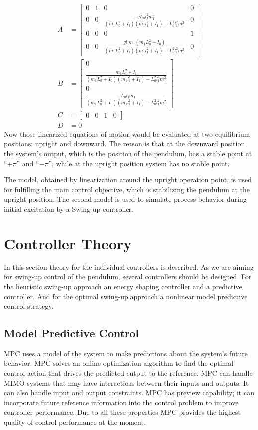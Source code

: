 \begin{subequations}\label{linmatrices}
	\begin{align}
	A &=\begin{bmatrix}0&1&0&0\\
	0&0&\frac{-gL_0l_1^2m_1^2}{(m_1L_0^2+I_0)(m_1l_1^2+I_1)-L_0^2l_1^2m_1^2}&0\\
	0&0&0&1\\
	0&0&\frac{gl_1m_1(m_1L_0^2+I_0)}{(m_1L_0^2+I_0)(m_1l_1^2+I_1)-L_0^2l_1^2m_1^2}&0
	\end{bmatrix}\\
	B &=	\begin{bmatrix}
	0\\ 
	\frac{m_1L_1^2+I_1}{(m_1L_0^2+I_0)(m_1l_1^2+I_1)-L_0^2l_1^2m_1^2}\\
	0\\
	\frac{-L_0l_1m_1}{(m_1L_0^2+I_0)(m_1l_1^2+I_1)-L_0^2l_1^2m_1^2}
	\end{bmatrix}\\
	C &= \begin{bmatrix}0&0&1&0\end{bmatrix}\\
	D &= 0
	\end{align}
\end{subequations}
Now those linearized equations of motion would be evaluated at two equilibrium positions: upright and downward. The reason is that at the downward position the system's output, which is the position of the pendulum, has a stable point at “$+\pi$” and “$-\pi$”, while at the upright position system has no stable point.

The model, obtained by linearization around the upright operation point, is used for fulfilling the main control objective, which is stabilizing the pendulum at the upright position. The second model is used to simulate process behavior during initial excitation by a Swing-up controller.
\section{Controller Theory}
In this section theory for the individual controllers is described. As we are aiming for swing-up control of the pendulum, several controllers should be designed. For the heuristic swing-up approach an energy shaping controller and a predictive controller. And for the optimal swing-up approach a nonlinear model predictive control strategy.
\subsection{Model Predictive Control}
MPC uses a model of the system to make predictions about the system’s future behavior. MPC solves an online optimization algorithm to find the optimal control action that drives the predicted output to the reference. MPC can handle MIMO systems that may have interactions between their inputs and outputs. It can also handle input and output constraints. MPC has preview capability; it can incorporate future reference information into the control problem to improve controller performance. Due to all these properties MPC provides the highest quality of control performance at the moment.
